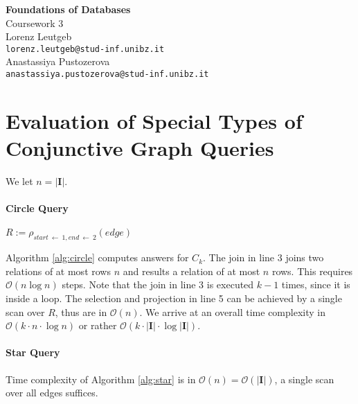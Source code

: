 \documentclass[a4paper,12pt]{article}
\newcommand{\dbi}{\ensuremath{\mathbf{I}}}
\newcommand{\bigo}{\ensuremath{\mathcal{O}}}
\begin{document}
\begin{center}
{\LARGE\bfseries Foundations of Databases}\\[3mm]

{\Large Coursework 3}\\[5mm]

Lorenz Leutgeb\\\texttt{lorenz.leutgeb@stud-inf.unibz.it}\\[2mm]
Anastassiya Pustozerova\\\texttt{anastassiya.pustozerova@stud-inf.unibz.it}
\end{center}

\section{Evaluation of Special Types of Conjunctive Graph Queries}

We let $n = |\dbi|$.

\paragraph{Circle Query}{
\begin{algorithm}
	$R := \rho_{start \: \leftarrow\: 1, end\: \leftarrow\: 2}(edge)$\\
	\caption{$\mathsf{EvalCircle}(k)$}
	\label{alg:circle}
\end{algorithm}

Algorithm \ref{alg:circle} computes answers for $C_k$. The join in line 3 joins two relations of at most rows $n$ and results a relation of at most $n$ rows. This requires $\bigo(n \log n)$ steps. Note that the join in line 3 is executed $k - 1$ times, since it is inside a loop. The selection and projection in line 5 can be achieved by a single scan over $R$, thus are in $\bigo(n)$. We arrive at an overall time complexity in $\bigo(k \cdot n \cdot \log n)$ or rather $\bigo(k \cdot |\dbi| \cdot \log |\dbi|)$.
}

\paragraph{Star Query}{

\begin{algorithm}
\caption{$\mathsf{EvalStar}(k)$}
\label{alg:star}
\end{algorithm}

Time complexity of Algorithm \ref{alg:star} is in $\bigo(n) = \bigo(|\dbi|)$, a single scan over all edges suffices.
}
\end{document}
